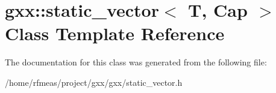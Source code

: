 \hypertarget{classgxx_1_1static__vector}{}\section{gxx\+:\+:static\+\_\+vector$<$ T, Cap $>$ Class Template Reference}
\label{classgxx_1_1static__vector}


The documentation for this class was generated from the following file\+:\begin{DoxyCompactItemize}
\item 
/home/rfmeas/project/gxx/gxx/static\+\_\+vector.\+h\end{DoxyCompactItemize}
